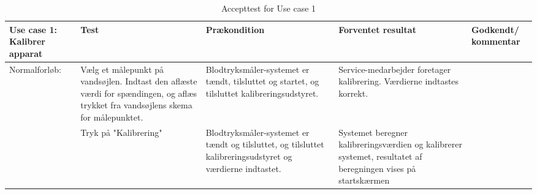 \begin{table}[H]
\caption{Accepttest for Use case 1}\label{tab:tabel8}
\begin{tabular}{|>{\raggedright\arraybackslash}p{2.5cm}| >{\raggedright\arraybackslash}p{2.9cm} | >{\raggedright\arraybackslash}p{2.9cm} | >{\raggedright\arraybackslash}p{2.9cm} | >{\raggedright\arraybackslash}p{2.8cm} |}
   \hline
   \textbf{Use case 1: Kalibrer apparat} &\textbf{Test}& \textbf{Prækondition} & \textbf{Forventet resultat} & \textbf{Godkendt/ kommentar}\\ \hline
   Normalforløb: & Vælg et målepunkt på vandsøjlen. Indtast den aflæste værdi for spændingen, og aflæs trykket fra vandsøjlens skema for målepunktet. & Blodtryksmåler-systemet er tændt, tilsluttet og startet, og tilsluttet kalibreringsudstyret. & Service-medarbejder foretager kalibrering. Værdierne indtastes korrekt. & \\\hline
   & Tryk på "Kalibrering" & Blodtryksmåler-systemet er tændt og tilsluttet, og tilsluttet kalibreringsudstyret og værdierne indtastet. & Systemet beregner kalibreringsværdien og kalibrerer systemet, resultatet af beregningen vises på startskærmen & \\\hline
\end{tabular}
\end{table}

